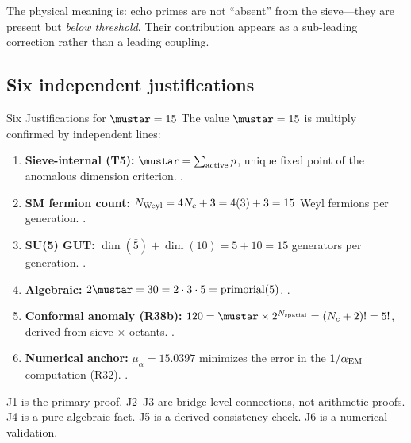\documentclass[12pt,a4paper]{article}
\begin{document}
The physical meaning is: echo primes are not ``absent'' from the
sieve---they are present but \emph{below threshold}. Their contribution
appears as a sub-leading correction rather than a leading coupling.

\subsection{Six independent justifications}
\label{sec:ch8_six}

\begin{thmbox}{Six Justifications for $\mustar = 15$}
\label{thm:six_justifications}
The value $\mustar = 15$ is multiply confirmed by independent lines:
\begin{enumerate}[leftmargin=*, label=\textbf{J\arabic*.}]
\item \textbf{Sieve-internal (T5):} $\mustar = \sum_{\text{active}} p$,
  unique fixed point of the anomalous dimension criterion. \THMTAG.
\item \textbf{SM fermion count:} $N_{\rm Weyl} = 4N_c + 3 = 4(3)+3 = 15$
  Weyl fermions per generation. \BRIDGETAG.
\item \textbf{SU(5) GUT:} $\dim(\bar{5}) + \dim(10) = 5 + 10 = 15$
  generators per generation. \BRIDGETAG.
\item \textbf{Algebraic:} $2\mustar = 30 = 2 \cdot 3 \cdot 5 = \mathrm{primorial}(5)$.
  \IDTAG.
\item \textbf{Conformal anomaly (R38b):} $120 = \mustar \times 2^{N_{\rm spatial}}
  = (N_c + 2)! = 5!$, derived from sieve $\times$ octants. \BRIDGETAG.
\item \textbf{Numerical anchor:} $\mu_\alpha = 15.0397$ minimizes the
  error in the $1/\alpha_{\rm EM}$ computation (R32). \VALTAG.
\end{enumerate}
\end{thmbox}

J1 is the primary proof. J2--J3 are bridge-level connections, not
arithmetic proofs. J4 is a pure algebraic fact. J5 is a derived
consistency check. J6 is a numerical validation.
\end{document}
